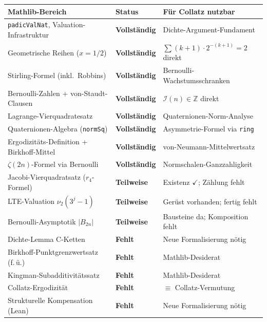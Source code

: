 \documentclass[12pt,a4paper]{article}
\newcommand{\vii}{\nu_2}
\newcommand{\Z}{\mathbb{Z}}
\begin{document}
\begin{center}
\renewcommand{\arraystretch}{1.4}
\begin{tabular}{>{\raggedright}p{5.5cm}
                >{\centering}p{2.5cm}
                >{\raggedright\arraybackslash}p{5.0cm}}
\toprule
\textbf{Mathlib-Bereich} & \textbf{Status} & \textbf{Für Collatz nutzbar} \\
\midrule
\texttt{padicValNat}, Valuation-Infrastruktur
  & \textcolor{mathlibgrün}{\bfseries Vollständig}
  & Dichte-Argument-Fundament \\[2pt]
Geometrische Reihen ($x=1/2$)
  & \textcolor{mathlibgrün}{\bfseries Vollständig}
  & $\sum(k+1)\cdot 2^{-(k+1)} = 2$ direkt \\[2pt]
Stirling-Formel (inkl.\ Robbins)
  & \textcolor{mathlibgrün}{\bfseries Vollständig}
  & Bernoulli-Wachstumsschranken \\[2pt]
Bernoulli-Zahlen + von-Staudt-Clausen
  & \textcolor{mathlibgrün}{\bfseries Vollständig}
  & $\mathcal{I}(n) \in \Z$ direkt \\[2pt]
Lagrange-Vierquadratesatz
  & \textcolor{mathlibgrün}{\bfseries Vollständig}
  & Quaternionen-Norm-Analyse \\[2pt]
Quaternionen-Algebra (\texttt{normSq})
  & \textcolor{mathlibgrün}{\bfseries Vollständig}
  & Asymmetrie-Formel via \texttt{ring} \\[2pt]
Ergodizitäts-Definition + Birkhoff-Mittel
  & \textcolor{mathlibgrün}{\bfseries Vollständig}
  & von-Neumann-Mittelwertsatz \\[2pt]
$\zeta(2n)$-Formel via Bernoulli
  & \textcolor{mathlibgrün}{\bfseries Vollständig}
  & Normschalen-Ganzzahligkeit \\[2pt]
\midrule
Jacobi-Vierquadratsatz ($r_4$-Formel)
  & \textcolor{warnorange}{\bfseries Teilweise}
  & Existenz $\checkmark$; Zählung fehlt \\[2pt]
LTE-Valuation $\vii(3^j-1)$
  & \textcolor{warnorange}{\bfseries Teilweise}
  & Gerüst vorhanden; fertig fehlt \\[2pt]
Bernoulli-Asymptotik $|B_{2n}|$
  & \textcolor{warnorange}{\bfseries Teilweise}
  & Bausteine da; Komposition fehlt \\[2pt]
\midrule
Dichte-Lemma C-Ketten
  & \textcolor{lückenrot}{\bfseries Fehlt}
  & Neue Formalisierung nötig \\[2pt]
Birkhoff-Punktgrenzwertsatz (f.\,ü.)
  & \textcolor{lückenrot}{\bfseries Fehlt}
  & Mathlib-Desiderat \\[2pt]
Kingman-Subadditivitätssatz
  & \textcolor{lückenrot}{\bfseries Fehlt}
  & Mathlib-Desiderat \\[2pt]
Collatz-Ergodizität
  & \textcolor{lückenrot}{\bfseries Fehlt}
  & $\equiv$ Collatz-Vermutung \\[2pt]
Strukturelle Kompensation (Lean)
  & \textcolor{lückenrot}{\bfseries Fehlt}
  & Neue Formalisierung nötig \\[2pt]
\bottomrule
\end{tabular}
\end{center}
\end{document}
